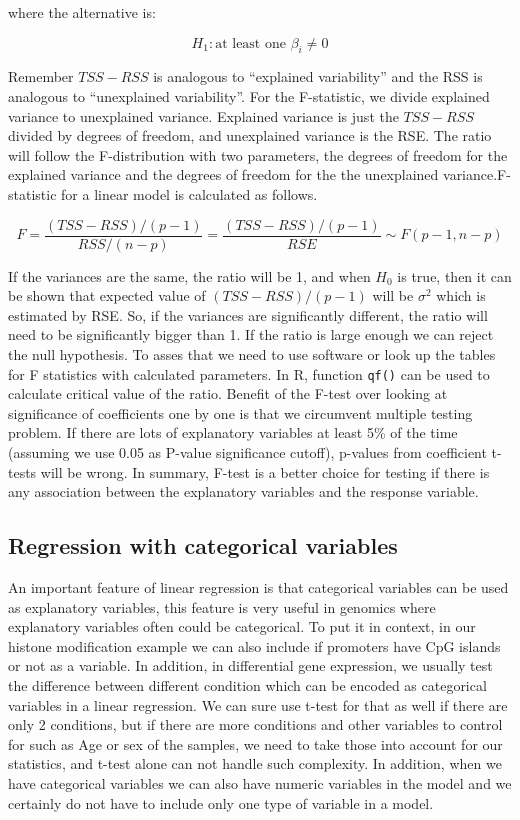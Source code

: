 \documentclass[12pt,]{krantz}
\theoremstyle{definition}
\theoremstyle{definition}
\theoremstyle{definition}
\theoremstyle{remark}
\begin{document}
where the alternative is:

\[H_1: \text{at least one } \beta_i \neq 0 \]

Remember \(TSS-RSS\) is analogous to ``explained variability'' and the
RSS is analogous to ``unexplained variability''. For the F-statistic, we
divide explained variance to unexplained variance. Explained variance is
just the \(TSS-RSS\) divided by degrees of freedom, and unexplained
variance is the RSE. The ratio will follow the F-distribution with two
parameters, the degrees of freedom for the explained variance and the
degrees of freedom for the the unexplained variance.F-statistic for a
linear model is calculated as follows.

\[F=\frac{(TSS-RSS)/(p-1)}{RSS/(n-p)}=\frac{(TSS-RSS)/(p-1)}{RSE} \sim F(p-1,n-p)\]

If the variances are the same, the ratio will be 1, and when \(H_0\) is
true, then it can be shown that expected value of \((TSS-RSS)/(p-1)\)
will be \(\sigma^2\) which is estimated by RSE. So, if the variances are
significantly different, the ratio will need to be significantly bigger
than 1. If the ratio is large enough we can reject the null hypothesis.
To asses that we need to use software or look up the tables for F
statistics with calculated parameters. In R, function \texttt{qf()} can
be used to calculate critical value of the ratio. Benefit of the F-test
over looking at significance of coefficients one by one is that we
circumvent multiple testing problem. If there are lots of explanatory
variables at least 5\% of the time (assuming we use 0.05 as P-value
significance cutoff), p-values from coefficient t-tests will be wrong.
In summary, F-test is a better choice for testing if there is any
association between the explanatory variables and the response variable.

\hypertarget{regression-with-categorical-variables}{%
\subsection{Regression with categorical
variables}\label{regression-with-categorical-variables}}

An important feature of linear regression is that categorical variables
can be used as explanatory variables, this feature is very useful in
genomics where explanatory variables often could be categorical. To put
it in context, in our histone modification example we can also include
if promoters have CpG islands or not as a variable. In addition, in
differential gene expression, we usually test the difference between
different condition which can be encoded as categorical variables in a
linear regression. We can sure use t-test for that as well if there are
only 2 conditions, but if there are more conditions and other variables
to control for such as Age or sex of the samples, we need to take those
into account for our statistics, and t-test alone can not handle such
complexity. In addition, when we have categorical variables we can also
have numeric variables in the model and we certainly do not have to
include only one type of variable in a model.
\end{document}
